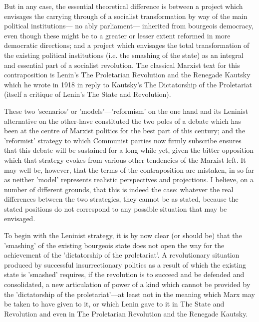 But in any case, the essential theoretical difference is between a project which envisages the carrying through of a socialist transformation by way of the main political institutions— no ably parliament— inherited from bourgeois democracy, even though these might be to a greater or lesser extent reformed in more democratic directions; and a project which envisages the total transformation of the existing political institutions (i.e. the smashing of the state) as an integral and essential part of a socialist revolution. The classical Marxist text for this contraposition is Lenin's The Proletarian Revolution and the Renegade Kautsky which he wrote in 1918 in reply to Kautsky's The Dictatorship of the Proletariat (itself a critique of Lenin's The State and Revolution).

These two 'scenarios' or 'models'—'reformism' on the one hand and its Leninist alternative on the other-have constituted the two poles of a debate which has been at the centre of Marxist politics for the best part of this century; and the 'reformist' strategy to which Communist parties now firmly subscribe ensures that this debate will be sustained for a long while yet,  given the bitter opposition which that strategy evokes from various other tendencies of the Marxist left. It may well be, however, that the terms of the contraposition are mistaken, in so far as neither 'model' represents realistic perspectives and projections. I believe, on a number of different grounds, that this is indeed the case: whatever the real differences between the two strategies, they cannot be as stated, because the stated positions do not correspond to any possible situation that may be envisaged.

To begin with the Leninist strategy, it is by now clear (or should be) that the 'smashing' of the existing bourgeois state does not open the way for the achievement of the 'dictatorship of the proletariat'. A revolutionary situation produced by successful insurrectionary politics as a result of which the existing state is 'smashed' requires, if the revolution is to succeed and be defended and consolidated, a new articulation of power of a kind which cannot be provided by the 'dictatorship of the proletariat'—at least not in the meaning which Marx may be taken to have given to it, or which Lenin gave to it in The State and Revolution and even in The Proletarian Revolution and the Renegade Kautsky.

